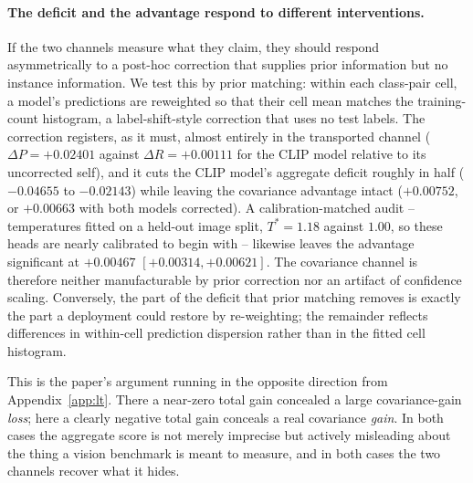 \paragraph{The deficit and the advantage respond to different interventions.} If the
two channels measure what they claim, they should respond asymmetrically to a post-hoc
correction that supplies prior information but no instance information. We test this by
prior matching: within each class-pair cell, a model's predictions are reweighted so
that their cell mean matches the training-count histogram, a label-shift-style
correction that uses no test labels. The correction registers, as it must, almost
entirely in the transported channel ($\Delta P=+0.02401$ against $\Delta R=+0.00111$ for the
CLIP model relative to its uncorrected self), and it cuts the CLIP model's aggregate
deficit roughly in half ($-0.04655$ to $-0.02143$) while leaving the covariance advantage
intact ($+0.00752$, or $+0.00663$ with both models corrected). A calibration-matched
audit -- temperatures fitted on a held-out image split, $T^*=1.18$ against $1.00$, so
these heads are nearly calibrated to begin with -- likewise leaves the advantage
significant at $+0.00467$ $[+0.00314,+0.00621]$. The covariance channel is therefore
neither manufacturable by prior correction nor an artifact of confidence scaling.
Conversely, the part of the deficit that prior matching removes is exactly the part a
deployment could restore by re-weighting; the remainder reflects differences in
within-cell prediction dispersion rather than in the fitted cell histogram.

This is the paper's argument running in the opposite direction from
Appendix~\ref{app:lt}. There a near-zero total gain concealed a large covariance-gain
\emph{loss}; here a clearly negative total gain conceals a real covariance \emph{gain}. In
both cases the aggregate score is not merely imprecise but actively misleading about the
thing a vision benchmark is meant to measure, and in both cases the two channels recover
what it hides.

\begin{table}[t]
\centering
\caption{Matched-subsample real-pixel study on the full VG150 test split (coverage
$99.0\%$, as in Table~\ref{tab:wager-results}). All three predictors are trained on the
same $100{,}000$ relations and differ only in features. CI is image-cluster robust on
$\widehat{\Delta R}$; $p$ is the 499-shift randomization diagnostic.}
\label{tab:vgvisual}
\end{table}

